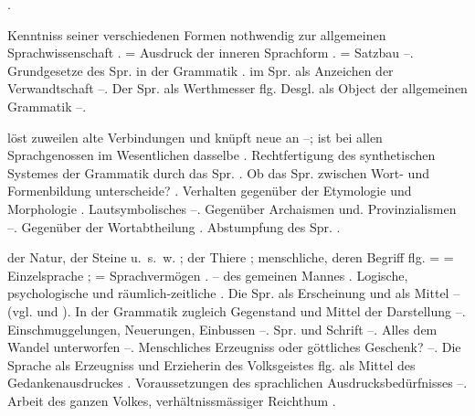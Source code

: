 \begin{register}
 \pageref{sp.276}.


 Kenntniss seiner verschiedenen Formen nothwendig zur allgemeinen Sprachwissenschaft \pageref{sp.50}. = Ausdruck der inneren Sprachform \pageref{sp.81}. = Satzbau \pageref{sp.81}–\pageref{sp.82}. Grundgesetze des Spr. in der Grammatik \pageref{sp.87}.  im Spr. als Anzeichen der Verwandtschaft \pageref{sp.149}–\pageref{sp.150}. Der Spr. als Werthmesser \pageref{sp.437} flg. Desgl. als Object der allgemeinen Grammatik \pageref{sp.479}–\pageref{sp.482}.

 löst zuweilen alte Verbindungen und knüpft neue an \pageref{sp.60}–\pageref{sp.61}; ist bei allen Sprachgenossen im Wesentlichen dasselbe \pageref{sp.64}. Rechtfertigung des synthetischen Systemes der Grammatik durch das Spr. \pageref{sp.97}. Ob das Spr. zwischen Wort- und Formenbildung unterscheide? \pageref{sp.122}. Verhalten gegenüber der Etymologie und Morphologie \pageref{sp.123}. Lautsymbolisches \pageref{sp.123}–\pageref{sp.124}. Gegenüber Archaismen und. Provinzialismen \pageref{sp.125}–\pageref{sp.127}. Gegenüber der Wortabtheilung \pageref{sp.132}.  Abstumpfung des Spr. \pageref{sp.275}.

 der Natur, der Steine u.~s.~w. \pageref{sp.2}; der Thiere \pageref{sp.2}; menschliche, deren Begriff \pageref{sp.3} flg. =   = Einzelsprache \pageref{sp.3}\sed{, \pageref{sp.8}}; = Sprachvermögen \pageref{sp.4}. – des gemeinen Mannes \pageref{sp.45}.  Logische, psychologische und räumlich-zeitliche  \pageref{sp.81}. Die Spr. als Erscheinung und als Mittel \pageref{sp.84}–\pageref{sp.85} (vgl.  und ). In der Grammatik zugleich Gegenstand und Mittel der Darstellung \pageref{sp.84}–\pageref{sp.85}. Einschmuggelungen, Neuerungen, Einbussen \pageref{sp.126}–\pageref{sp.127}. Spr. und Schrift \pageref{sp.127}–\pageref{sp.135}. Alles dem Wandel unterworfen \pageref{sp.168}–\pageref{sp.169}.  Menschliches Erzeugniss oder göttliches Geschenk? \pageref{sp.303}–\pageref{sp.304}. Die Sprache als Erzeugniss und Erzieherin des Volksgeistes \pageref{sp.387} flg.  als Mittel des Gedankenausdruckes \pageref{sp.429}. Voraussetzungen des sprachlichen Ausdrucksbedürfnisses \pageref{sp.437}–\pageref{sp.438}. Arbeit des  ganzen Volkes, verhältnissmässiger Reichthum \pageref{sp.470}.


\end{register}
